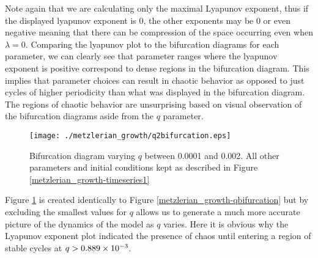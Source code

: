 Note again that we are calculating only the maximal Lyapunov exponent, thus if the displayed lyapunov exponent is 0, the other exponents may be 0 or even negative meaning that there can be compression of the space occurring even when $\lambda=0$. Comparing the lyapunov plot to the bifurcation diagrams for each parameter, we can clearly see that parameter ranges where the lyapunov exponent is positive correspond to dense regions in the bifurcation diagram. This implies that parameter choices can result in chaotic behavior as opposed to just cycles of higher periodicity than what was displayed in the bifurcation diagram. The regions of chaotic behavior are unsurprising based on visual observation of the bifurcation diagrams aside from the $q$ parameter.
\begin{figure}
    \centering
    \texttt{[image: ./metzlerian\_growth/q2bifurcation.eps]}
    \caption{Bifurcation diagram varying $q$ between 0.0001 and 0.002. All other parameters and initial conditions kept as described in Figure \ref{metzlerian_growth-timeseries1}}
    \label{metzlerian_growth-qbifurcation_zoom}
\end{figure}
Figure \ref{metzlerian_growth-qbifurcation_zoom} is created identically to Figure \ref{metzlerian_growth-qbifurcation} but by excluding the smallest values for $q$ allows us to generate a much more accurate picture of the dynamics of the model as $q$ varies. Here it is obvious why the Lyapunov exponent plot indicated the presence of chaos until entering a region of stable cycles at $q>\num{0.889d-3}$.











